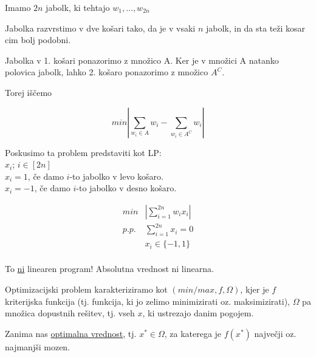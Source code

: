 \documentclass[11pt, a4paper]{article}
\begin{document}
        \begin{example}
            Imamo \(2n\) jabolk, ki tehtajo \(w_1,...,w_{2n}\)
            \par
            Jabolka razvrstimo v dve košari tako, da je v vsaki \(n\) jabolk, in da sta teži kosar cim bolj podobni.

            \par
            Jabolka v 1. košari ponazorimo z množico A. Ker je v množici A natanko polovica jabolk, lahko 2. košaro ponazorimo z množico \(A^C\).

            \par
            Torej iščemo
            \begin{center}
                \[
                    min |\sum_{w_i \in A}{w_i} - \sum_{w_i \in A^C}{w_i}|
                \]
            \end{center}
            
            \par
            Poskusimo ta problem predstaviti kot LP: \\
            \(x_i\); \(i \in [2n]\) \\
            \(x_i = 1\), če damo \(i\)-to jabolko v levo košaro. \\
            \(x_i = -1\), če damo \(i\)-to jabolko v desno košaro. \\

            \begin{table}[h!]
                \[
                    \begin{array}{ cc }
                        min &
                            \displaystyle |\sum_{i=1}^{2n}{w_i x_i}| \\
                        
                        p.p. & 
                            \displaystyle \sum_{i=1}^{2n}{x_i} = 0 \\
                        &
                            x_i \in \{-1, 1\} \\
                    \end{array}
                \]
            \end{table}
            
            To \underline{ni} linearen program! Absolutna vrednost ni linearna.
        \end{example}

    \begin{definition}
        Optimizacijski problem karakteriziramo kot \((min/max, f, \Omega)\), kjer je \(f\) kriterijska funkcija (tj. funkcija, ki jo zelimo minimizirati oz. maksimizirati), \(\Omega\) pa množica dopustnih rešitev, tj. vseh \(x\), ki ustrezajo danim pogojem. 
    \end{definition}
    Zanima nas \underline{optimalna vrednost}, tj. \(x^* \in \Omega\), za katerega je \(f(x^*)\) največji oz. najmanjši mozen.
\end{document}
